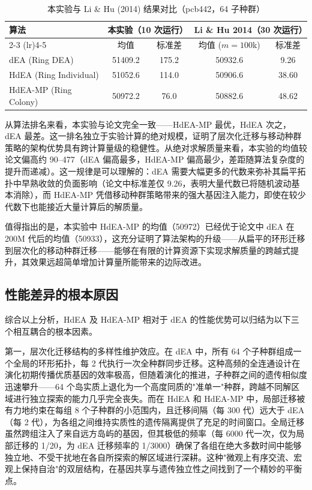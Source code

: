 \begin{table}[H]
\centering
\caption{本实验与 Li \& Hu (2014) 结果对比（pcb442，64 子种群）}
\label{tab:paper_comparison}
\begin{tabular}{lcccc}
\toprule
算法 & \multicolumn{2}{c}{本实验（10 次运行）} &
\multicolumn{2}{c}{Li \& Hu 2014（30 次运行）} \\
\cmidrule(lr){2-3} \cmidrule(lr){4-5}
 & 均值 & 标准差 & 均值 ($m=100$k) & 标准差 \\
\midrule
dEA (Ring DEA) & 51409.2 & 175.2 & 50932.6 & 9.26 \\
HdEA (Ring Individual) & 51052.6 & 114.0 & 50906.6 & 38.60 \\
HdEA-MP (Ring Colony) & 50972.2 & 76.0 & 50882.6 & 48.62 \\
\bottomrule
\end{tabular}
\end{table}

从算法排名来看，本实验与论文完全一致——HdEA-MP 最优，HdEA 次之，dEA 最差。这一排名独立于实验计算的绝对规模，证明了层次化迁移与移动种群策略的架构优势具有跨计算量级的稳健性。从绝对求解质量来看，本实验的均值较论文偏高约 90--477（dEA 偏高最多，HdEA-MP 偏高最少，差距随算法复杂度的提升而递减）。这一规律是可以理解的：dEA 需要大幅更多的代数来弥补其扁平拓扑中早熟收敛的负面影响（论文中标准差仅 9.26，表明大量代数已将随机波动基本消除），而 HdEA-MP 凭借移动种群策略带来的强大基因注入能力，即使在较少代数下也能接近大量计算后的解质量。

值得指出的是，本实验中 HdEA-MP 的均值（50972）已经优于论文中 dEA 在 200M 代后的均值（50933），这充分证明了算法架构的升级——从扁平的环形迁移到层次化的移动种群迁移——能够在有限的计算资源下实现求解质量的跨越式提升，其效果远超简单增加计算量所能带来的边际改进。

\subsection{性能差异的根本原因}

综合以上分析，HdEA 及 HdEA-MP 相对于 dEA 的性能优势可以归结为以下三个相互耦合的根本因素。

第一，层次化迁移结构的多样性维护效应。在 dEA 中，所有 64 个子种群组成一个全局的环形拓扑，每 2 代执行一次全种群同步迁移。这种高频的全连通设计在演化初期传播优质基因的效率极高，但随着演化的推进，子种群之间的遗传相似度迅速攀升——64 个岛实质上退化为一个高度同质的"准单一"种群，跨越不同解区域进行独立探索的能力几乎完全丧失。而在 HdEA 和 HdEA-MP 中，局部迁移被有力地约束在每组 8 个子种群的小范围内，且迁移间隔（每 300 代）远大于 dEA（每 2 代），为各组之间维持实质性的遗传隔离提供了充足的时间窗口。全局迁移虽然跨组注入了来自远方岛屿的基因，但其极低的频率（每 6000 代一次，仅为局部迁移的 1/20，为 dEA 迁移频率的 1/3000）确保了各组在绝大多数时间中能够独立地、不受干扰地在各自所探索的解区域进行深耕。这种"微观上有序交流、宏观上保持自治"的双层结构，在基因共享与遗传独立性之间找到了一个精妙的平衡点。

